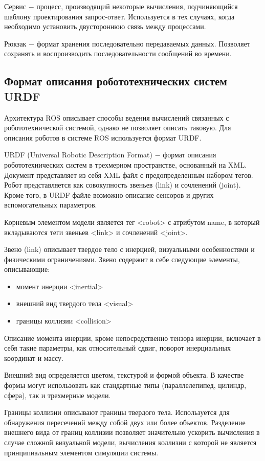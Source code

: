 \documentclass[oneside,final,14pt]{extreport}
\newcommand{\indentSpace}{1.25cm}
\begin{document}
Сервис $-$ процесс, производящий некоторые вычисления, подчиняющийся шаблону проектирования запрос-ответ. Используется в тех случаях, когда необходимо установить двустороннюю связь между процессами. 

Рюкзак $-$ формат хранения последовательно передаваемых данных. Позволяет сохранять и воспроизводить последовательности сообщений во времени.

\subsection{Формат описания робототехнических систем  URDF}
\label{chapt:URDF}
Архитектура ROS описывает способы ведения вычислений связанных с робототехнической системой, однако не позволяет описать таковую. Для описания роботов в системе ROS используется формат URDF.

URDF (Universal Robotic Description Format) $-$ формат описания робототехнических систем в трехмерном пространстве, основанный на XML. Документ представляет из себя XML файл с предопределенным набором тегов. Робот представляется как совокупность звеньев (link) и сочленений (joint). Кроме того, в URDF файле возможно описание сенсоров и других вспомогательных параметров. 

Корневым элементом модели является тег <robot> с атрибутом name, в который вкладываются теги звеньев <link> и сочленений <joint>.

Звено (link) описывает твердое тело с инерцией, визуальными особенностями и физическими ограничениями. Звено содержит в себе следующие элементы, описывающие:

\begin{itemize}
\item момент инерции <inertial>
\setlength{\itemindent}{-\indentSpace }
\item внешний вид твердого тела <visual>
\item границы коллизии <collision>
\end{itemize}

Описание момента инерции, кроме непосредственно тензора инерции, включает в себя такие параметры, как относительный сдвиг, поворот инерциальных координат и массу.

Внешний вид определяется цветом, текстурой и формой объекта. В качестве формы могут использовать как стандартные типы (параллелепипед, цилиндр, сфера), так и трехмерные модели. 

Границы коллизии описывают границы твердого тела. Используется для обнаружения пересечений между собой двух или более объектов. Разделение внешнего вида от границ коллизии позволяет значительно ускорить вычисления в случае сложной визуальной модели, вычисления коллизии с которой не является принципиальным элементом симуляции системы. 
\end{document}
